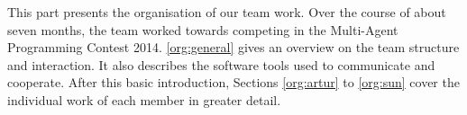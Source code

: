 This part presents the organisation of our team work.
Over the course of about seven months, the team worked towards competing in the Multi-Agent Programming Contest 2014.
\autoref{org:general} gives an overview on the team structure and interaction.
It also describes the software tools used to communicate and cooperate.
After this basic introduction, Sections \ref{org:artur} to \ref{org:sun} cover the individual work of each member in greater detail. %














